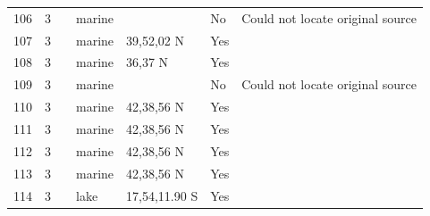\documentclass[12pt]{article}
\begin{document}
\begin{landscape}
\begin{table}[h!]
{\begin{tabular}{p{2.8cm}p{1.3cm}p{5.5cm}p{2.2cm}p{2.5cm}lp{3.5cm}}
        106   & 3 & \cite{Glynn1965}  & marine &       & No    & Could not locate original source \\
        107   & 3 & \cite{Peterson1979}  & marine & 39,52,02 N & Yes   &       \\
        108   & 3 & \cite{Hewatt1937}  & marine & 36,37 N & Yes   &       \\
        109   & 3 & \cite{Castilla1981} & marine &       & No    & Could not locate original source \\
        110   & 3 & \cite{Dexter1947}  & marine & 42,38,56 N & Yes   &       \\
        111   & 3 & \cite{Dexter1947}  & marine & 42,38,56 N & Yes   &       \\
        112   & 3 & \cite{Dexter1947}  & marine & 42,38,56 N & Yes   &       \\
        113   & 3 & \cite{Dexter1947}  & marine & 42,38,56 N & Yes   &       \\
        114   & 3 & \cite{Marshall1982}  & lake  & 17,54,11.90 S & Yes   &       \\
        \hline
      \end{tabular}}%
      \end{table}

        \newpage



\end{landscape}
\end{document}
